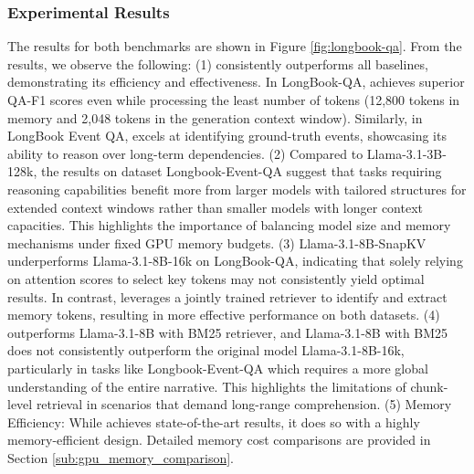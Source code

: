 \subsubsection{Experimental Results}
The results for both benchmarks are shown in Figure \ref{fig:longbook-qa}. From the results, we observe the following: (1) \ours consistently outperforms all baselines, demonstrating its efficiency and effectiveness. In LongBook-QA, \ours achieves superior QA-F1 scores even while processing the least number of tokens (12,800 tokens in memory and 2,048 tokens in the generation context window). Similarly, in LongBook Event QA, \ours excels at identifying ground-truth events, showcasing its ability to reason over long-term dependencies. (2) Compared to Llama-3.1-3B-128k, the results on dataset Longbook-Event-QA suggest that tasks requiring reasoning capabilities benefit more from larger models with tailored structures for extended context windows rather than smaller models with longer context capacities. This highlights the importance of balancing model size and memory mechanisms under fixed GPU memory budgets. (3) Llama-3.1-8B-SnapKV underperforms Llama-3.1-8B-16k on LongBook-QA, indicating that solely relying on attention scores to select key tokens may not consistently yield optimal results. In contrast, \ours leverages a jointly trained retriever to identify and extract memory tokens, resulting in more effective performance on both datasets. (4) \ours outperforms Llama-3.1-8B with BM25 retriever, and Llama-3.1-8B with BM25 does not consistently outperform the original model Llama-3.1-8B-16k, particularly in tasks like Longbook-Event-QA which requires a more global understanding of the entire narrative. This highlights the limitations of chunk-level retrieval in scenarios that demand long-range comprehension. (5)
Memory Efficiency: While \ours achieves state-of-the-art results, it does so with a highly memory-efficient design. Detailed memory cost comparisons are provided in Section \ref{sub:gpu_memory_comparison}. 


